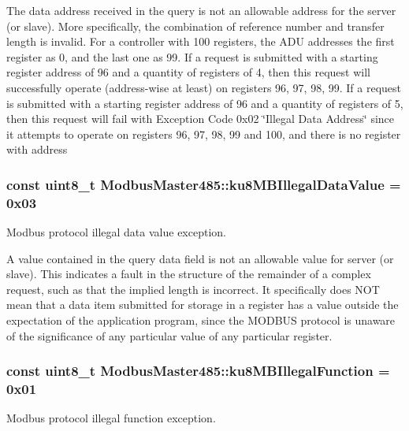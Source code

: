 The data address received in the query is not an allowable address for the server (or slave). More specifically, the combination of reference number and transfer length is invalid. For a controller with 100 registers, the A\+DU addresses the first register as 0, and the last one as 99. If a request is submitted with a starting register address of 96 and a quantity of registers of 4, then this request will successfully operate (address-\/wise at least) on registers 96, 97, 98, 99. If a request is submitted with a starting register address of 96 and a quantity of registers of 5, then this request will fail with Exception Code 0x02 \char`\"{}\+Illegal Data Address\char`\"{} since it attempts to operate on registers 96, 97, 98, 99 and 100, and there is no register with address
\begin{DoxyEnumerate}
\item 
\end{DoxyEnumerate}
\subsubsection[{\texorpdfstring{ku8\+M\+B\+Illegal\+Data\+Value}{ku8MBIllegalDataValue}}]{\setlength{\rightskip}{0pt plus 5cm}const uint8\+\_\+t Modbus\+Master485\+::ku8\+M\+B\+Illegal\+Data\+Value = 0x03\hspace{0.3cm}{\ttfamily [static]}}\hypertarget{class_modbus_master485_a393b0b7ea005a15cb3d88bad75bdcdf2}{}\label{class_modbus_master485_a393b0b7ea005a15cb3d88bad75bdcdf2}
Modbus protocol illegal data value exception.

A value contained in the query data field is not an allowable value for server (or slave). This indicates a fault in the structure of the remainder of a complex request, such as that the implied length is incorrect. It specifically does N\+OT mean that a data item submitted for storage in a register has a value outside the expectation of the application program, since the M\+O\+D\+B\+US protocol is unaware of the significance of any particular value of any particular register. 
\subsubsection[{\texorpdfstring{ku8\+M\+B\+Illegal\+Function}{ku8MBIllegalFunction}}]{\setlength{\rightskip}{0pt plus 5cm}const uint8\+\_\+t Modbus\+Master485\+::ku8\+M\+B\+Illegal\+Function = 0x01\hspace{0.3cm}{\ttfamily [static]}}\hypertarget{class_modbus_master485_a7057a8d96e13d4aef825efb4598f08c1}{}\label{class_modbus_master485_a7057a8d96e13d4aef825efb4598f08c1}
Modbus protocol illegal function exception.

